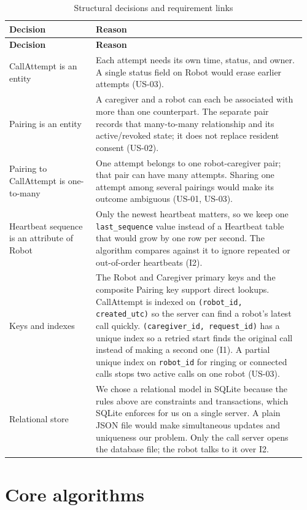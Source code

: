 \documentclass[12pt,letterpaper]{article}
\newcommand{\field}[1]{\texttt{#1}}
\begin{document}
\begingroup\small
\begin{longtable}{@{}>{\RaggedRight\arraybackslash}p{0.28\linewidth}>{\RaggedRight\arraybackslash}p{0.68\linewidth}@{}}
\caption{Structural decisions and requirement links}\\
\toprule\textbf{Decision} & \textbf{Reason}\\\midrule\endfirsthead
\toprule\textbf{Decision} & \textbf{Reason}\\\midrule\endhead
\midrule\endfoot\bottomrule\endlastfoot
CallAttempt is an entity & Each attempt needs its own time, status, and owner. A single status field on Robot would erase earlier attempts (US-03). \\
Pairing is an entity & A caregiver and a robot can each be associated with more than one counterpart. The separate pair records that many-to-many relationship and its active/revoked state; it does not replace resident consent (US-02). \\
Pairing to CallAttempt is one-to-many & One attempt belongs to one robot-caregiver pair; that pair can have many attempts. Sharing one attempt among several pairings would make its outcome ambiguous (US-01, US-03). \\
Heartbeat sequence is an attribute of Robot & Only the newest heartbeat matters, so we keep one \field{last\_sequence} value instead of a Heartbeat table that would grow by one row per second. The algorithm compares against it to ignore repeated or out-of-order heartbeats (I2). \\
Keys and indexes & The Robot and Caregiver primary keys and the composite Pairing key support direct lookups. CallAttempt is indexed on \field{(robot\_id, created\_utc)} so the server can find a robot's latest call quickly. \field{(caregiver\_id, request\_id)} has a unique index so a retried start finds the original call instead of making a second one (I1). A partial unique index on \field{robot\_id} for ringing or connected calls stops two active calls on one robot (US-03). \\
Relational store & We chose a relational model in SQLite because the rules above are constraints and transactions, which SQLite enforces for us on a single server. A plain JSON file would make simultaneous updates and uniqueness our problem. Only the call server opens the database file; the robot talks to it over I2. \\
\end{longtable}
\endgroup

\section{Core algorithms}
\end{document}
